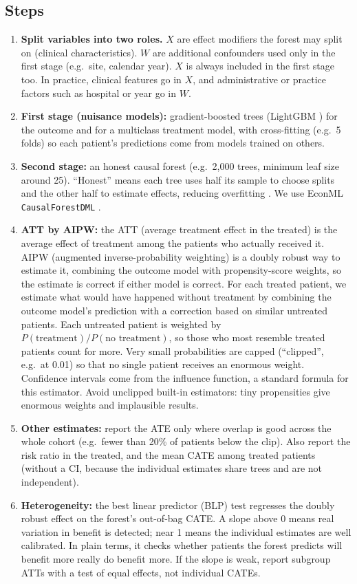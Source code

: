 \subsection{Steps}

\begin{enumerate}
\item \textbf{Split variables into two roles.} $X$ are effect modifiers the forest may split on (clinical characteristics). $W$ are additional confounders used only in the first stage (e.g.\ site, calendar year). $X$ is always included in the first stage too. In practice, clinical features go in $X$, and administrative or practice factors such as hospital or year go in $W$.
\item \textbf{First stage (nuisance models):} gradient-boosted trees (LightGBM \cite{ke2017lightgbm}) for the outcome and for a multiclass treatment model, with cross-fitting (e.g.\ 5 folds) so each patient's predictions come from models trained on others.
\item \textbf{Second stage:} an honest causal forest (e.g.\ 2,000 trees, minimum leaf size around 25). ``Honest'' means each tree uses half its sample to choose splits and the other half to estimate effects, reducing overfitting \cite{athey2016,wager2018}. We use EconML \texttt{CausalForestDML} \cite{battocchi2019econml}.
\item \textbf{ATT by AIPW:} the ATT (average treatment effect in the treated) is the average effect of treatment among the patients who actually received it. AIPW (augmented inverse-probability weighting) is a doubly robust way to estimate it, combining the outcome model with propensity-score weights, so the estimate is correct if either model is correct. For each treated patient, we estimate what would have happened without treatment by combining the outcome model's prediction with a correction based on similar untreated patients. Each untreated patient is weighted by $P(\text{treatment}) / P(\text{no treatment})$, so those who most resemble treated patients count for more. Very small probabilities are capped (``clipped'', e.g.\ at 0.01) so that no single patient receives an enormous weight. Confidence intervals come from the influence function, a standard formula for this estimator. Avoid unclipped built-in estimators: tiny propensities give enormous weights and implausible results.
\item \textbf{Other estimates:} report the ATE only where overlap is good across the whole cohort (e.g.\ fewer than 20\% of patients below the clip). Also report the risk ratio in the treated, and the mean CATE among treated patients (without a CI, because the individual estimates share trees and are not independent).
\item \textbf{Heterogeneity:} the best linear predictor (BLP) test \cite{chernozhukov2025} regresses the doubly robust effect on the forest's out-of-bag CATE. A slope above 0 means real variation in benefit is detected; near 1 means the individual estimates are well calibrated. In plain terms, it checks whether patients the forest predicts will benefit more really do benefit more. If the slope is weak, report subgroup ATTs with a test of equal effects, not individual CATEs.
\end{enumerate}

